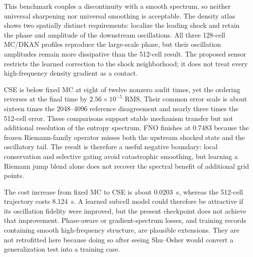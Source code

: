 \documentclass[10pt,twocolumn]{article}
\begin{document}
This benchmark couples a discontinuity with a smooth spectrum, so neither universal sharpening nor universal smoothing is acceptable. The density atlas shows two spatially distinct requirements: localize the leading shock and retain the phase and amplitude of the downstream oscillations. All three 128-cell MC/DKAN profiles reproduce the large-scale phase, but their oscillation amplitudes remain more dissipative than the 512-cell result. The proposed sensor restricts the learned correction to the shock neighborhood; it does not treat every high-frequency density gradient as a contact.

CSE is below fixed MC at eight of twelve nonzero audit times, yet the ordering reverses at the final time by $2.56\times10^{-5}$ RMS. Their common error scale is about sixteen times the 2048--4096 reference disagreement and nearly three times the 512-cell error. These comparisons support stable mechanism transfer but not additional resolution of the entropy spectrum. FNO finishes at 0.7483 because the frozen Riemann-family operator misses both the upstream shocked state and the oscillatory tail. The result is therefore a useful negative boundary: local conservation and selective gating avoid catastrophic smoothing, but learning a Riemann jump blend alone does not recover the spectral benefit of additional grid points.

The cost increase from fixed MC to CSE is about 0.0203~s, whereas the 512-cell trajectory costs 8.124~s. A learned subcell model could therefore be attractive if its oscillation fidelity were improved, but the present checkpoint does not achieve that improvement. Phase-aware or gradient-spectrum losses, and training records containing smooth high-frequency structure, are plausible extensions. They are not retrofitted here because doing so after seeing Shu--Osher would convert a generalization test into a training case.
\end{document}
